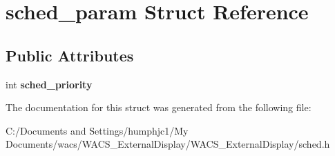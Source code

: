 \hypertarget{structsched__param}{
\section{sched\_\-param Struct Reference}
\label{structsched__param}
}
\subsection*{Public Attributes}
\begin{DoxyCompactItemize}
\item 
\hypertarget{structsched__param_aa0f2640949273f2c30549ed8d1bb197e}{
int {\bfseries sched\_\-priority}}
\label{structsched__param_aa0f2640949273f2c30549ed8d1bb197e}

\end{DoxyCompactItemize}


The documentation for this struct was generated from the following file:\begin{DoxyCompactItemize}
\item 
C:/Documents and Settings/humphjc1/My Documents/wacs/WACS\_\-ExternalDisplay/WACS\_\-ExternalDisplay/sched.h\end{DoxyCompactItemize}
